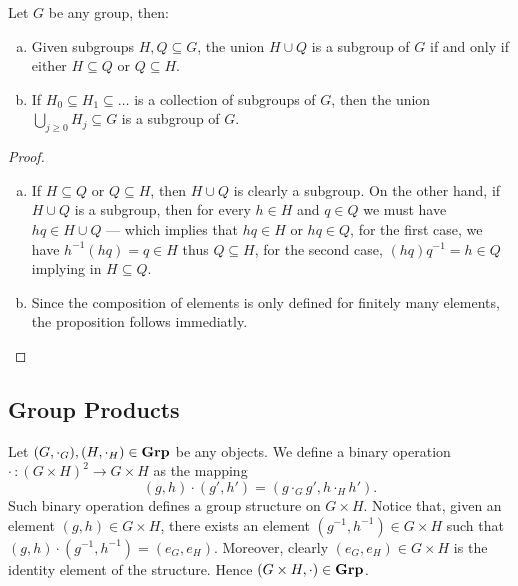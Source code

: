 \begin{proposition}
\label{prop:union-of-subgroups}
Let \(G\) be any group, then:
\begin{enumerate}[(a)]\setlength\itemsep{0em}
\item Given subgroups \(H, Q \subseteq G\), the union \(H \cup Q\) is a subgroup
of \(G\) if and only if either \(H \subseteq Q\) or \(Q \subseteq H\).

\item If \(H_0 \subseteq H_1 \subseteq \dots\) is a collection of subgroups of
\(G\), then the union \(\bigcup_{j \geq 0} H_j \subseteq G\) is a subgroup of
\(G\).
\end{enumerate}
\end{proposition}

\begin{proof}
\begin{enumerate}[(a)]\setlength\itemsep{0em}
\item If \(H \subseteq Q\) or \(Q \subseteq H\), then \(H \cup Q\) is clearly a
subgroup. On the other hand, if \(H \cup Q\) is a subgroup, then for every \(h
\in H\) and \(q \in Q\) we must have \(hq \in H \cup Q\) --- which implies that
\(hq \in H\) or \(hq \in Q\), for the first case, we have \(h^{-1}(h q) = q
\in H\) thus \(Q \subseteq H\), for the second case, \((h q) q^{-1} = h \in Q\)
implying in \(H \subseteq Q\).

\item Since the composition of elements is only defined for finitely many
elements, the proposition follows immediatly.
\end{enumerate}
\end{proof}

\subsection{Group Products}

Let \((G, \cdot_G), (H, \cdot_H) \in {\textbf{Grp}}\) be any objects. We define a
binary operation \(\cdot\,: (G \times H)^2 \to G \times H\) as the mapping
\begin{equation}\label{eq: grp-prod-bin}
(g, h) \cdot (g', h') = (g \cdot_G g', h \cdot_H h').
\end{equation}
Such binary operation defines a group structure on \(G \times H\). Notice that,
given an element \((g, h) \in G \times H\), there exists an element \((g^{-1},
h^{-1}) \in G \times H\) such that \((g, h) \cdot (g^{-1}, h^{-1}) = (e_G,
e_H)\). Moreover, clearly \((e_G, e_H) \in G \times H\) is the identity element
of the structure. Hence \((G \times H, \cdot) \in {\textbf{Grp}}\).

